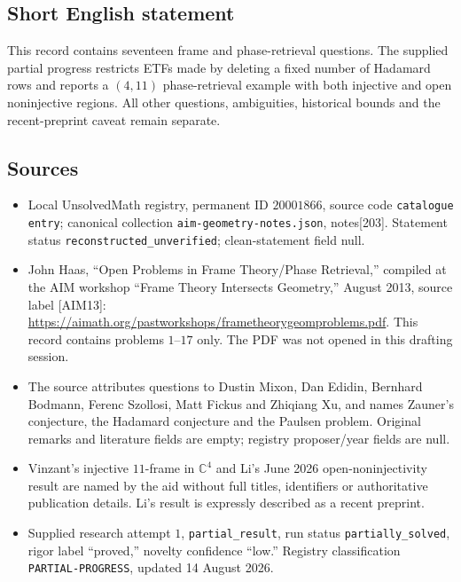\documentclass[11pt]{article}
\newcommand{\C}{\mathbb{C}}
\begin{document}
\subsection{Short English statement}
This record contains seventeen frame and phase-retrieval questions. The supplied partial progress restricts ETFs made by deleting a fixed number of Hadamard rows and reports a \((4,11)\) phase-retrieval example with both injective and open noninjective regions. All other questions, ambiguities, historical bounds and the recent-preprint caveat remain separate.
\subsection{Sources}
\begin{itemize}
\item Local UnsolvedMath registry, permanent ID \(20001866\), source code \texttt{catalogue entry}; canonical collection \texttt{aim-geometry-notes.json}, notes[203]. Statement status \texttt{reconstructed\_unverified}; clean-statement field null.
\item John Haas, ``Open Problems in Frame Theory/Phase Retrieval,'' compiled at the AIM workshop ``Frame Theory Intersects Geometry,'' August 2013, source label [AIM13]: \url{https://aimath.org/pastworkshops/frametheorygeomproblems.pdf}. This record contains problems \(1\)--\(17\) only. The PDF was not opened in this drafting session.
\item The source attributes questions to Dustin Mixon, Dan Edidin, Bernhard Bodmann, Ferenc Szollosi, Matt Fickus and Zhiqiang Xu, and names Zauner's conjecture, the Hadamard conjecture and the Paulsen problem. Original remarks and literature fields are empty; registry proposer/year fields are null.
\item Vinzant's injective \(11\)-frame in \(\C^4\) and Li's June 2026 open-noninjectivity result are named by the aid without full titles, identifiers or authoritative publication details. Li's result is expressly described as a recent preprint.
\item Supplied research attempt \(1\), \texttt{partial\_result}, run status \texttt{partially\_solved}, rigor label ``proved,'' novelty confidence ``low.'' Registry classification \texttt{PARTIAL-PROGRESS}, updated 14 August 2026.
\end{itemize}
\end{document}
